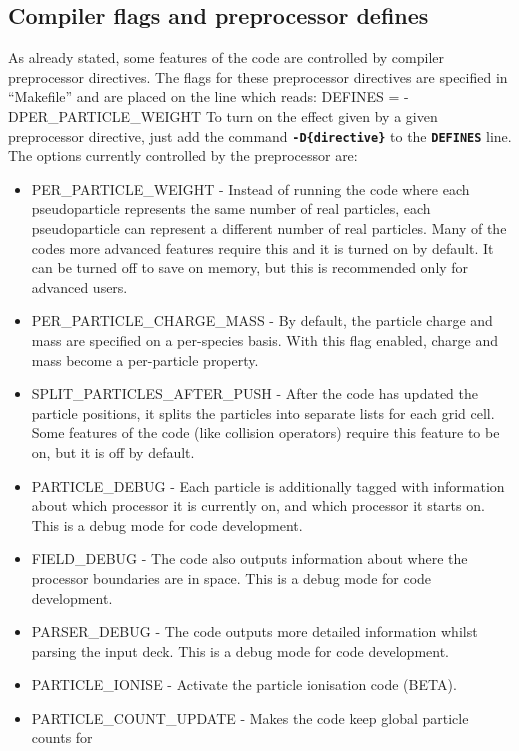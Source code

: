 \documentclass[12pt,a4paper]{article}
\newcommand{\inlinecode}[1]{{\color{warwickred} \bf\texttt{#1}}}
\newenvironment{boxverbatim}{\lboxverbatim{none}}{\endlboxverbatim}
\begin{document}
\subsection{Compiler flags and preprocessor defines}
As already stated, some features of the code are controlled by compiler
preprocessor directives. The flags for these preprocessor directives are
specified in ``Makefile'' and are placed on the line which reads:
\begin{boxverbatim}
DEFINES = -DPER_PARTICLE_WEIGHT
\end{boxverbatim}
To turn on the effect given by a given preprocessor directive, just add the
command \inlinecode{-D\{directive\}} to the \inlinecode{DEFINES} line. The
options currently controlled by the preprocessor are:\\
\begin{itemize}
\item PER\_PARTICLE\_WEIGHT - Instead of running the code where each
  pseudoparticle represents the same number of real particles, each
  pseudoparticle can represent a different number of real particles. Many of
  the codes more advanced features require this and it is turned on by
  default. It can be turned off to save on memory, but this is recommended
  only for advanced users.
\item PER\_PARTICLE\_CHARGE\_MASS - By default, the particle charge and
  mass are specified on a per-species basis. With this flag enabled, charge
  and mass become a per-particle property.
\item SPLIT\_PARTICLES\_AFTER\_PUSH - After the code has updated the particle
  positions, it splits the particles into separate lists for each grid
  cell. Some features of the code (like collision operators) require this
  feature to be on, but it is off by default.
\item PARTICLE\_DEBUG - Each particle is additionally tagged with information
  about which processor it is currently on, and which processor it starts
  on. This is a debug mode for code development.
\item FIELD\_DEBUG - The code also outputs information about where the
  processor boundaries are in space. This is a debug mode for code development.
\item PARSER\_DEBUG - The code outputs more detailed information whilst
  parsing the input deck. This is a debug mode for code development.
\item PARTICLE\_IONISE - Activate the particle ionisation code (BETA).
\item PARTICLE\_COUNT\_UPDATE - Makes the code keep global particle counts for

\end{itemize}
\end{document}
